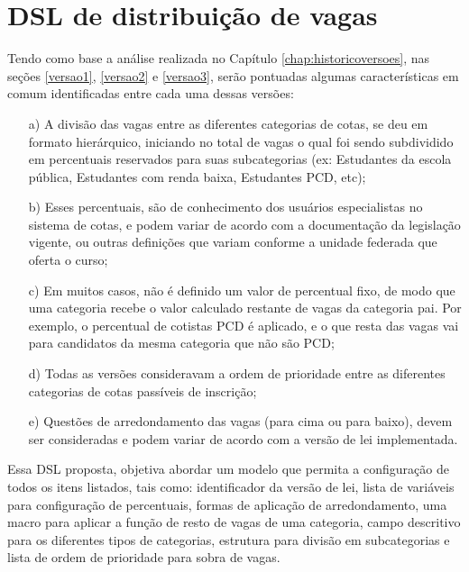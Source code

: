 \section{DSL de distribuição de vagas}
\label{sec:dslproposta:usuario}

   
 Tendo como base a análise realizada no Capítulo \ref{chap:historicoversoes}, nas seções \ref{versao1}, \ref{versao2} e \ref{versao3}, serão pontuadas algumas características em comum identificadas entre cada uma dessas versões:
   
   \begin{enumerate}
    \item[a)] A divisão das vagas entre as diferentes categorias de cotas, se deu em formato hierárquico, iniciando no total de vagas o qual foi sendo subdividido em percentuais reservados para suas subcategorias (ex: Estudantes da escola pública, Estudantes com renda baixa, Estudantes PCD, etc); 
   
   \item[b)] Esses percentuais, são de conhecimento dos usuários especialistas no sistema de cotas, e podem variar de acordo com a documentação da legislação vigente, ou outras definições que variam conforme a unidade federada que oferta o curso; 
   
   \item[c)] Em muitos casos, não é definido um valor de percentual fixo, de modo que uma categoria recebe o valor calculado restante de vagas da categoria pai. Por exemplo, o percentual de cotistas \gls{PCD} é aplicado, e o que resta das vagas vai para candidatos da mesma categoria que não são \gls{PCD};

   \item[d)] Todas as versões consideravam a ordem de prioridade entre as diferentes categorias de cotas passíveis de inscrição;
   
   \item[e)] Questões de arredondamento das vagas (para cima ou para baixo), devem ser consideradas e podem variar de acordo com a versão de lei implementada.

   \end{enumerate}
   
   Essa \gls{DSL} proposta, objetiva abordar um modelo que permita a configuração de todos os itens listados, tais como: identificador da versão de lei, lista de variáveis para configuração de percentuais, formas de aplicação de arredondamento, uma macro para aplicar a função de resto de vagas de uma categoria, campo descritivo para os diferentes tipos de categorias, estrutura para divisão em subcategorias e lista de ordem de prioridade para sobra de vagas.
   
